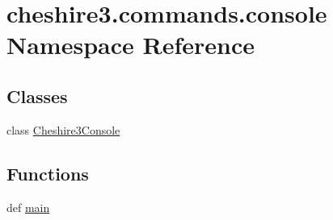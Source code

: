 \hypertarget{namespacecheshire3_1_1commands_1_1console}{\section{cheshire3.\-commands.\-console Namespace Reference}
\label{namespacecheshire3_1_1commands_1_1console}
}
\subsection*{Classes}
\begin{DoxyCompactItemize}
\item 
class \hyperlink{classcheshire3_1_1commands_1_1console_1_1_cheshire3_console}{Cheshire3\-Console}
\end{DoxyCompactItemize}
\subsection*{Functions}
\begin{DoxyCompactItemize}
\item 
def \hyperlink{namespacecheshire3_1_1commands_1_1console_ab8b618494c550b4560235f7640037b71}{main}
\end{DoxyCompactItemize}
